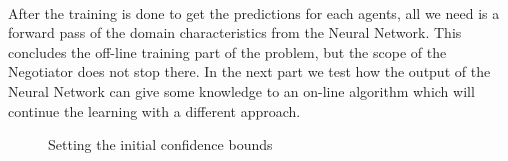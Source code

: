 \paragraph{}



After the training is done to get the predictions for each agents, 
all we need is a forward pass of the domain characteristics from the Neural Network. 
This concludes the off-line training part of the problem, but the scope of the Negotiator does not stop there.
In the next part we test how the output of the Neural Network can give some knowledge to an on-line algorithm 
which will continue the learning with a different approach.
\begin{figure}[H]
	\centering
	\captionsetup{justification=centering}
	\caption{Setting the initial confidence bounds}
	\label{fig:Setting the initial confidence bounds}
\end{figure}
 
